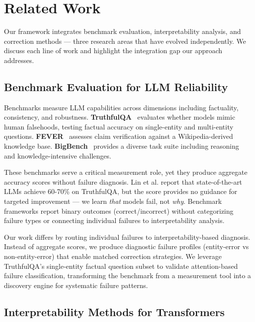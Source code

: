 \section{Related Work}
\label{sec:related}

Our framework integrates benchmark evaluation, interpretability analysis, and correction methods --- three research areas that have evolved independently. We discuss each line of work and highlight the integration gap our approach addresses.

\subsection{Benchmark Evaluation for LLM Reliability}

Benchmarks measure LLM capabilities across dimensions including factuality, consistency, and robustness. \textbf{TruthfulQA}~\cite{Lin2021TruthfulQA} evaluates whether models mimic human falsehoods, testing factual accuracy on single-entity and multi-entity questions. \textbf{FEVER}~\cite{Thorne2018FEVER} assesses claim verification against a Wikipedia-derived knowledge base. \textbf{BigBench}~\cite{Srivastava2022BigBench} provides a diverse task suite including reasoning and knowledge-intensive challenges.

These benchmarks serve a critical measurement role, yet they produce aggregate accuracy scores without failure diagnosis. Lin et al. report that state-of-the-art LLMs achieve 60-70\% on TruthfulQA, but the score provides no guidance for targeted improvement --- we learn \textit{that} models fail, not \textit{why}. Benchmark frameworks report binary outcomes (correct/incorrect) without categorizing failure types or connecting individual failures to interpretability analysis.

Our work differs by routing individual failures to interpretability-based diagnosis. Instead of aggregate scores, we produce diagnostic failure profiles (entity-error vs non-entity-error) that enable matched correction strategies. We leverage TruthfulQA's single-entity factual question subset to validate attention-based failure classification, transforming the benchmark from a measurement tool into a discovery engine for systematic failure patterns.

\subsection{Interpretability Methods for Transformers}

